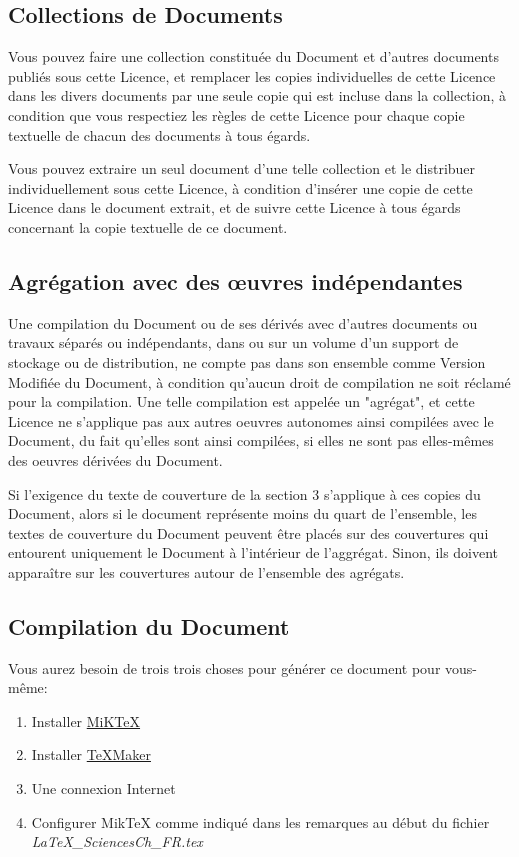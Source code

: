 	\subsection{Collections de Documents}
	Vous pouvez faire une collection constituée du Document et d'autres documents publiés sous cette Licence, et remplacer les copies individuelles de cette Licence dans les divers documents par une seule copie qui est incluse dans la collection, à condition que vous respectiez les règles de cette Licence pour chaque copie textuelle de chacun des documents à tous égards.

	Vous pouvez extraire un seul document d'une telle collection et le distribuer individuellement sous cette Licence, à condition d'insérer une copie de cette Licence dans le document extrait, et de suivre cette Licence à tous égards concernant la copie textuelle de ce document.

	\subsection{Agrégation avec des œuvres indépendantes} 
	Une compilation du Document ou de ses dérivés avec d'autres documents ou travaux séparés ou indépendants, dans ou sur un volume d'un support de stockage ou de distribution, ne compte pas dans son ensemble comme Version Modifiée du Document, à condition qu'aucun droit de compilation ne soit réclamé pour la compilation. Une telle compilation est appelée un "agrégat", et cette Licence ne s'applique pas aux autres oeuvres autonomes ainsi compilées avec le Document, du fait qu'elles sont ainsi compilées, si elles ne sont pas elles-mêmes des oeuvres dérivées du Document.

	Si l'exigence du texte de couverture de la section 3 s'applique à ces copies du Document, alors si le document représente moins du quart de l'ensemble, les textes de couverture du Document peuvent être placés sur des couvertures qui entourent uniquement le Document à l'intérieur de l'aggrégat. Sinon, ils doivent apparaître sur les couvertures autour de l'ensemble des agrégats.
	
	\subsection{Compilation du Document}
	Vous aurez besoin de trois trois choses pour générer ce document pour vous-même:
	\begin{enumerate}
		\item Installer \href{https://miktex.org/}{MiKTeX}

		\item Installer \href{http://www.xm1math.net/texmaker/index_fr.html}{TeXMaker}

		\item Une connexion Internet

		\item Configurer MikTeX comme indiqué dans les remarques au début du fichier \textit{LaTeX\_SciencesCh\_FR.tex}
	\end{enumerate}

